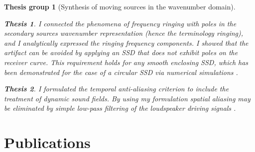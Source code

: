 \documentclass[10pt,twoside]{article}
\theoremstyle{thesisgroupstyle}
\newtheorem{thesisgroup}{Thesis group}
\theoremstyle{indented}
\newtheorem{thesis}{Thesis}[thesisgroup]
\begin{document}
\begin{thesisgroup}[Synthesis of moving sources in the wavenumber domain]
\begin{thesis}
I connected the phenomena of frequency ringing with poles in the secondary sources wavenumber representation (hence the terminology \emph{ringing}), and I analytically expressed the ringing frequency components.
I showed that the artifact can be avoided by applying an SSD that does not exhibit poles on the receiver curve.
This requirement holds for any smooth enclosing SSD, which has been demonstrated for the case of a circular SSD via numerical simulations \cite{firtha2016:daga_booklet}.
\end{thesis}
\begin{thesis} 
I formulated the temporal anti-aliasing criterion to include the treatment of dynamic sound fields.
By using my formulation spatial aliasing may be eliminated by simple low-pass filtering of the loudspeaker driving signals \cite{Firtha2018_daga_moving_source_booklet}.
\end{thesis}
\end{thesisgroup}

\clearpage
\section*{Publications}

\begin{refcontext}[labelprefix=J]
\printbibliography[title={Journal papers}, keyword=J, heading=subbibliography] 
\end{refcontext}
\begin{refcontext}[labelprefix=C]
\printbibliography[title={Conference papers}, keyword=C, heading=subbibliography] 
\end{refcontext}
\begin{refcontext}[labelprefix=O]
\printbibliography[title={Conference papers}, keyword=C, heading=subbibliography] 
\end{refcontext}
\end{document}
